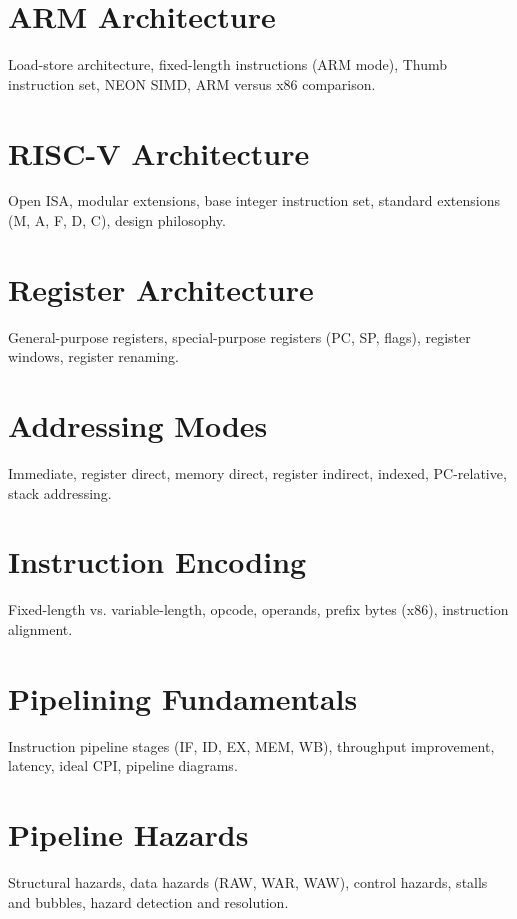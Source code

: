 \chapter{ARM Architecture}
Load-store architecture, fixed-length instructions (ARM mode), Thumb instruction set, NEON SIMD, ARM versus x86 comparison.

\chapter{RISC-V Architecture}
Open ISA, modular extensions, base integer instruction set, standard extensions (M, A, F, D, C), design philosophy.

\chapter{Register Architecture}
General-purpose registers, special-purpose registers (PC, SP, flags), register windows, register renaming.

\chapter{Addressing Modes}
Immediate, register direct, memory direct, register indirect, indexed, PC-relative, stack addressing.

\chapter{Instruction Encoding}
Fixed-length vs. variable-length, opcode, operands, prefix bytes (x86), instruction alignment.


\chapter{Pipelining Fundamentals}
Instruction pipeline stages (IF, ID, EX, MEM, WB), throughput improvement, latency, ideal CPI, pipeline diagrams.

\chapter{Pipeline Hazards}
Structural hazards, data hazards (RAW, WAR, WAW), control hazards, stalls and bubbles, hazard detection and resolution.


